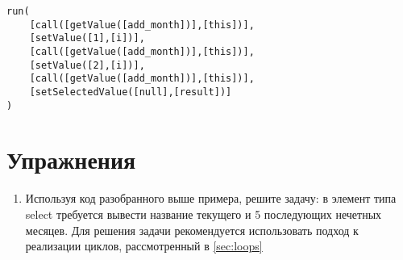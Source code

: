 \documentclass[10pt]{book}
\begin{document}
\begin{verbatim}
run(
    [call([getValue([add_month])],[this])],
    [setValue([1],[i])],
    [call([getValue([add_month])],[this])],
    [setValue([2],[i])],
    [call([getValue([add_month])],[this])],
    [setSelectedValue([null],[result])]
)
\end{verbatim}

\section{Упражнения}

\begin{enumerate}
	\item Используя код разобранного выше примера, решите задачу: в элемент типа select требуется вывести название текущего и 5 последующих нечетных месяцев. Для решения задачи рекомендуется использовать подход к реализации циклов, рассмотренный в  \autoref{sec:loops}
	
\end{enumerate}
\end{document}
